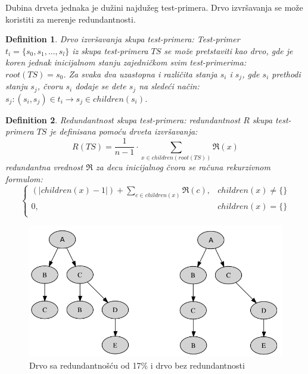 \documentclass[a4paper]{article}
\newtheorem{definition}{Definition}[section]
\begin{document}
Dubina drveta jednaka je dužini najdužeg test-primera. Drvo izvršavanja se može koristiti za merenje redundantnosti.

\begin{definition}{Drvo izvršavanja skupa test-primera:}
Test-primer $t_i = \{s_0, s_1, ..., s_l\}$ iz skupa test-primera $TS$ se može pretstaviti kao drvo, gde je koren jednak inicijalnom stanju zajedničkom svim test-primerima: $root(TS) = s_0$. Za svaka dva uzastopna i različita stanja $s_i$ i $s_j$, gde $s_i$ prethodi stanju $s_j$, čvoru $s_i$ dodaje se dete $s_j$ na sledeći način: $s_j: (s_i, s_j) \in t_i \rightarrow s_j \in children(s_i)$.
\end{definition}

\begin{definition}{Redundantnost skupa test-primera:}
redundantnost $R$ skupa test-primera $TS$ je definisana pomoću drveta izvršavanja:
\begin{equation}
\label{eq:suma}
    R(TS) = \frac{1}{n-1} \cdot \sum_{x \in children(root(TS))} \Re(x)
\end{equation}
redundantna vrednost $\Re$ za decu inicijalnog čvora se računa rekurzivnom formulom:
$$
    \begin{cases}
    (|children(x)-1|) + \sum_{c \in children(x)} \Re(c),  &  children(x) \neq \{\} \\
    0, &  children(x) = \{\} \\
    \end{cases}
$$
\end{definition}

\begin{figure}[h!]
\begin{center}
\includegraphics[scale=0.25]{redudancy.png}
\end{center}
\caption{Drvo sa redundantnošću od 17\% i drvo bez redundantnosti}
\label{fig:redundancy}
\end{figure}
\end{document}

